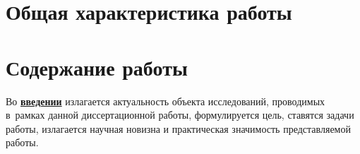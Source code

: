 \section*{Общая характеристика работы}

\newcommand{\actuality}{\pdfbookmark[1]{Актуальность}{actuality}\underline{\textbf{\actualityTXT}}}
\newcommand{\progress}{\pdfbookmark[1]{Разработанность темы}{progress}\underline{\textbf{\progressTXT}}}
\newcommand{\aim}{\pdfbookmark[1]{Цели}{aim}\underline{{\textbf\aimTXT}}}
\newcommand{\tasks}{\pdfbookmark[1]{Задачи}{tasks}\underline{\textbf{\tasksTXT}}}
\newcommand{\aimtasks}{\pdfbookmark[1]{Цели и задачи}{aimtasks}\aimtasksTXT}
\newcommand{\novelty}{\pdfbookmark[1]{Научная новизна}{novelty}\underline{\textbf{\noveltyTXT}}}
\newcommand{\influence}{\pdfbookmark[1]{Практическая значимость}{influence}\underline{\textbf{\influenceTXT}}}
\newcommand{\methods}{\pdfbookmark[1]{Методология и методы исследования}{methods}\underline{\textbf{\methodsTXT}}}
\newcommand{\defpositions}{\pdfbookmark[1]{Положения, выносимые на защиту}{defpositions}\underline{\textbf{\defpositionsTXT}}}
\newcommand{\reliability}{\pdfbookmark[1]{Достоверность}{reliability}\underline{\textbf{\reliabilityTXT}}}
\newcommand{\probation}{\pdfbookmark[1]{Апробация}{probation}\underline{\textbf{\probationTXT}}}
\newcommand{\contribution}{\pdfbookmark[1]{Личный вклад}{contribution}\underline{\textbf{\contributionTXT}}}
\newcommand{\publications}{\pdfbookmark[1]{Публикации}{publications}\underline{\textbf{\publicationsTXT}}}




\section*{Содержание работы}
Во \underline{\textbf{введении}} излагается актуальность
объекта исследований, проводимых в~рамках данной диссертационной работы,
формулируется цель, ставятся задачи работы, излагается научная новизна
и практическая значимость представляемой работы.


